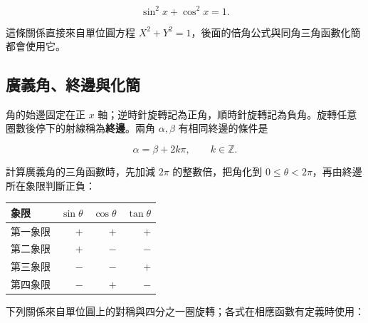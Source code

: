 \documentclass[11pt,a4paper]{article}
\newcounter{none}
\begin{document}
\[
\boxed{\sin^2x+\cos^2x=1}.
\]

這條關係直接來自單位圓方程 \(X^2+Y^2=1\)，後面的倍角公式與同角三角函數化簡都會使用它。

\subsection{廣義角、終邊與化簡}\label{ux5ee3ux7fa9ux89d2ux7d42ux908aux8207ux5316ux7c21}

角的始邊固定在正 \(x\) 軸；逆時針旋轉記為正角，順時針旋轉記為負角。旋轉任意圈數後停下的射線稱為\textbf{終邊}。兩角 \(\alpha,\beta\) 有相同終邊的條件是

\[
\boxed{\alpha=\beta+2k\pi},
\qquad k\in\mathbb Z.
\]

計算廣義角的三角函數時，先加減 \(2\pi\) 的整數倍，把角化到 \(0\le\theta<2\pi\)，再由終邊所在象限判斷正負：

{\def\LTcaptype{none} %
\begin{longtable}[]{@{}lrrr@{}}
\toprule\noalign{}
象限 & \(\sin\theta\) & \(\cos\theta\) & \(\tan\theta\) \\
\midrule\noalign{}
\endhead
\bottomrule\noalign{}
\endlastfoot
第一象限 & \(+\) & \(+\) & \(+\) \\
第二象限 & \(+\) & \(-\) & \(-\) \\
第三象限 & \(-\) & \(-\) & \(+\) \\
第四象限 & \(-\) & \(+\) & \(-\) \\
\end{longtable}
}

下列關係來自單位圓上的對稱與四分之一圈旋轉；各式在相應函數有定義時使用：
\end{document}
